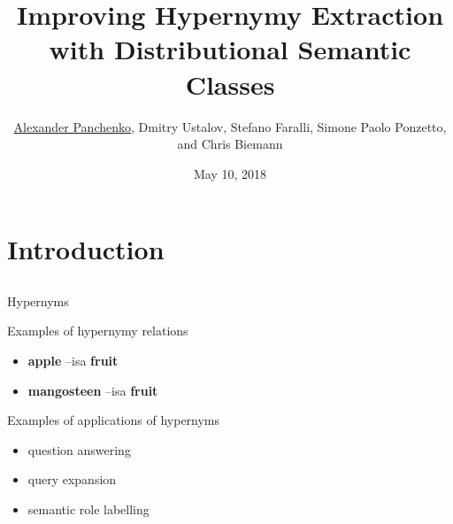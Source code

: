\documentclass[usenames,dvipsnames,notes]{beamer}
\title{Improving Hypernymy Extraction with Distributional Semantic Classes}
\author[Panchenko et al. LREC'18]{\underline{Alexander Panchenko}, Dmitry Ustalov, Stefano Faralli, Simone Paolo Ponzetto, and Chris Biemann}
\date[10.05.2018]{May 10, 2018}
\begin{document}
\maketitle

%
\section{Introduction}
\subsection{}


\begin{frame}{Hypernyms}

\begin{block}{Examples of hypernymy relations}
\begin{itemize}
	\item \textbf{apple} --isa\textrightarrow \textbf{ fruit}
	\item \textbf{mangosteen} --isa\textrightarrow \textbf{ fruit}
\end{itemize}
\end{block}

\pause

\begin{block}{Examples of applications of hypernyms}
\begin{itemize}
	\item question answering~\cite{Zhou:13} 
	\item query expansion~\cite{gong2005web}
	\item semantic role labelling~\cite{shi2005putting} 
\end{itemize}
\end{block}
\end{frame}

\end{document}

